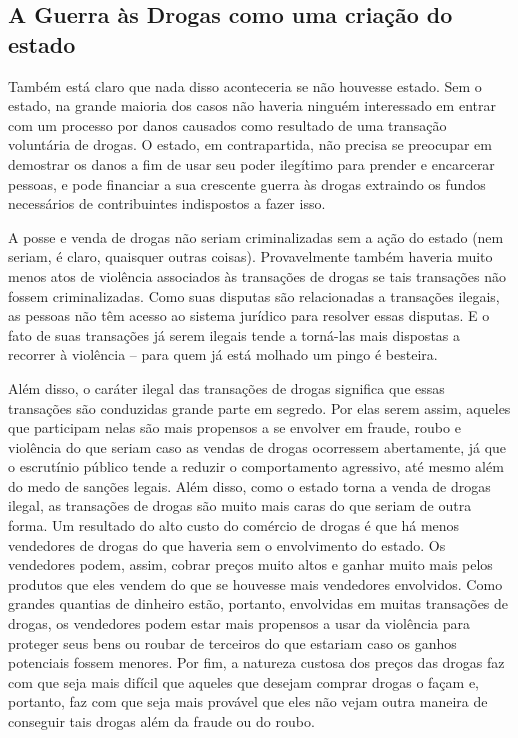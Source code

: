 \subsection*{A Guerra às Drogas como uma criação do estado}

Também está claro que nada disso aconteceria se não houvesse estado. Sem o estado, na grande maioria dos casos não haveria ninguém interessado em entrar com um processo por danos causados como resultado de uma transação voluntária de drogas. O estado, em contrapartida, não precisa se preocupar em demostrar os danos a fim de usar seu poder ilegítimo para prender e encarcerar pessoas, e pode financiar a sua crescente guerra às drogas extraindo os fundos necessários de contribuintes indispostos a fazer isso.

A posse e venda de drogas não seriam criminalizadas sem a ação do estado (nem seriam, é claro, quaisquer outras coisas). Provavelmente também haveria muito menos atos de violência associados às transações de drogas se tais transações não fossem criminalizadas. Como suas disputas são relacionadas a transações ilegais, as pessoas não têm acesso ao sistema jurídico para resolver essas disputas. E o fato de suas transações já serem ilegais tende a torná-las mais dispostas a recorrer à violência -- para quem já está molhado um pingo é besteira.

Além disso, o caráter ilegal das transações de drogas significa que essas transações são conduzidas grande parte em segredo. Por elas serem assim, aqueles que participam nelas são mais propensos a se envolver em fraude, roubo e violência do que seriam caso as vendas de drogas ocorressem abertamente, já que o escrutínio público tende a reduzir o comportamento agressivo, até mesmo além do medo de sanções legais. Além disso, como o estado torna a venda de drogas ilegal, as transações de drogas são muito mais caras do que seriam de outra forma. Um resultado do alto custo do comércio de drogas é que há menos vendedores de drogas do que haveria sem o envolvimento do estado. Os vendedores podem, assim, cobrar preços muito altos e ganhar muito mais pelos produtos que eles vendem do que se houvesse mais vendedores envolvidos. Como grandes quantias de dinheiro estão, portanto, envolvidas em muitas transações de drogas, os vendedores podem estar mais propensos a usar da violência para proteger seus bens ou roubar de terceiros do que estariam caso os ganhos potenciais fossem menores. Por fim, a natureza custosa dos preços das drogas faz com que seja mais difícil que aqueles que desejam comprar drogas o façam e, portanto, faz com que seja mais provável que eles não vejam outra maneira de conseguir tais drogas além da fraude ou do roubo.

